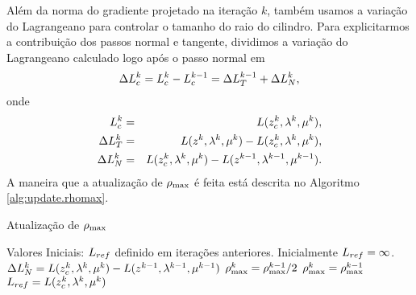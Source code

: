 Al\'em da norma do gradiente projetado na itera\c{c}\~ao $k$, tamb\'em usamos
a varia\c{c}\~ao do Lagrangeano para controlar o tamanho do raio do cilindro.
Para explicitarmos a contribuição dos passos normal e tangente, dividimos a
variação do Lagrangeano calculado logo após o passo normal em
\begin{equation}\visiblelbl{DLC}
  \Delta \Lc{k} = \Lc{k} - \Lc{k-1} = \DLH{k-1} + \DLV{k},
\end{equation}
onde 
\begin{eqnarray}
  \Lc{k} & = & L(\zc{k},\lk{k},\mu^k), \nonumber \\
 \DLH{k} & = & L(z^k,\lk{k},\mu^k) - L(\zc{k},\lk{k},\mu^k) \visiblelbl{DLH}, \\
 \DLV{k} & = & L(\zc{k},\lk{k}, \mu^k) - L(z^{k-1},\lk{k-1},\mu^{k-1}).
  \visiblelbl{def:DLN}
\end{eqnarray}
A maneira que a atualização de $\rho_{\max}$ é feita está descrita no Algoritmo
\ref{alg:update.rhomax}.
\begin{algorithm}[H]
\caption{Atualização de $\rho_{\max}$}
\begin{algorithmic}[1]
\State Valores Iniciais: $L_{ref}$ definido em iterações anteriores.
  Inicialmente $L_{ref} = \infty$.
\State $\Delta L_N^k = L(z_c^k,\lambda^{k},\mu^k) - L(z^{k-1},\lambda^{k-1},\mu^{k-1})$
  \State $\rho_{\max}^k = \rho_{\max}^{k-1}/2$
\Else
  \State $\rho_{\max}^k = \rho_{\max}^{k-1}$
\EndIf
{}
  \State $L_{ref} = L(z_c^{k},\lambda^{k},\mu^k)$
\EndIf
\end{algorithmic}
\end{algorithm}

\ifdraft
\else


\fi

